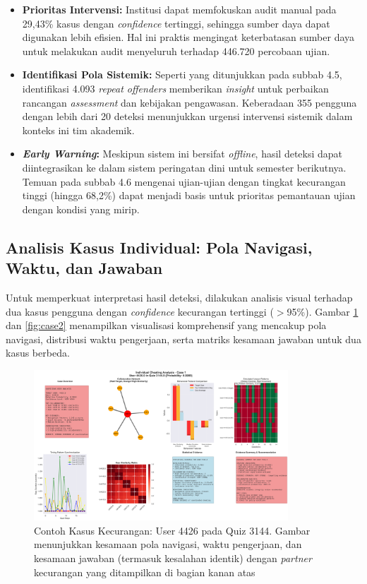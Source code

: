 \begin{itemize}
    \item \textbf{Prioritas Intervensi:} Institusi dapat memfokuskan audit manual pada 29,43\% kasus dengan \textit{confidence} tertinggi, sehingga sumber daya dapat digunakan lebih efisien. Hal ini praktis mengingat keterbatasan sumber daya untuk melakukan audit menyeluruh terhadap 446.720 percobaan ujian.
    \item \textbf{Identifikasi Pola Sistemik:} Seperti yang ditunjukkan pada subbab 4.5, identifikasi 4.093 \textit{repeat offenders} memberikan \textit{insight} untuk perbaikan rancangan \textit{assessment} dan kebijakan pengawasan. Keberadaan 355 pengguna dengan lebih dari 20 deteksi menunjukkan urgensi intervensi sistemik dalam konteks ini tim akademik.
    \item \textbf{\textit{Early Warning}:} Meskipun sistem ini bersifat \textit{offline}, hasil deteksi dapat diintegrasikan ke dalam sistem peringatan dini untuk semester berikutnya. Temuan pada subbab 4.6 mengenai ujian-ujian dengan tingkat kecurangan tinggi (hingga 68,2\%) dapat menjadi basis untuk prioritas pemantauan ujian dengan kondisi yang mirip.
\end{itemize}

\subsection{Analisis Kasus Individual: Pola Navigasi, Waktu, dan Jawaban}
\label{subsec:analisisKasusIndividual}

Untuk memperkuat interpretasi hasil deteksi, dilakukan analisis visual terhadap dua kasus pengguna dengan \textit{confidence} kecurangan tertinggi ($>$95\%). Gambar \ref{fig:case1} dan \ref{fig:case2} menampilkan visualisasi komprehensif yang mencakup pola navigasi, distribusi waktu pengerjaan, serta matriks kesamaan jawaban untuk dua kasus berbeda.

\begin{figure}[h!]
    \centering
    \includegraphics[width=0.85\textwidth]{newfigures/individual_case_1_user_4426.0_quiz_3144.0.png}
    \caption{Contoh Kasus Kecurangan: User 4426 pada Quiz 3144. Gambar menunjukkan kesamaan pola navigasi, waktu pengerjaan, dan kesamaan jawaban (termasuk kesalahan identik) dengan \textit{partner} kecurangan yang ditampilkan di bagian kanan atas}
    \label{fig:case1}
\end{figure}

